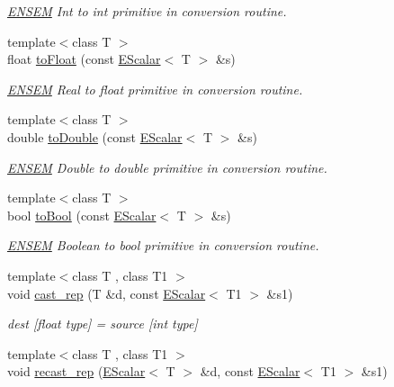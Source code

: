 \begin{DoxyCompactItemize}
\begin{DoxyCompactList}\small\item\em \mbox{\hyperlink{namespaceENSEM}{E\+N\+S\+EM}} Int to int primitive in conversion routine. \end{DoxyCompactList}\item 
{\footnotesize template$<$class T $>$ }\\float \mbox{\hyperlink{group__escalar_gaf21f130175f8bc3a98a90272dc196b2c}{to\+Float}} (const \mbox{\hyperlink{classENSEM_1_1EScalar}{E\+Scalar}}$<$ T $>$ \&s)
\begin{DoxyCompactList}\small\item\em \mbox{\hyperlink{namespaceENSEM}{E\+N\+S\+EM}} Real to float primitive in conversion routine. \end{DoxyCompactList}\item 
{\footnotesize template$<$class T $>$ }\\double \mbox{\hyperlink{group__escalar_ga981890bacedbaccd67983030f792d927}{to\+Double}} (const \mbox{\hyperlink{classENSEM_1_1EScalar}{E\+Scalar}}$<$ T $>$ \&s)
\begin{DoxyCompactList}\small\item\em \mbox{\hyperlink{namespaceENSEM}{E\+N\+S\+EM}} Double to double primitive in conversion routine. \end{DoxyCompactList}\item 
{\footnotesize template$<$class T $>$ }\\bool \mbox{\hyperlink{group__escalar_ga67754bbbfd7795820548f6c6bb9c6b19}{to\+Bool}} (const \mbox{\hyperlink{classENSEM_1_1EScalar}{E\+Scalar}}$<$ T $>$ \&s)
\begin{DoxyCompactList}\small\item\em \mbox{\hyperlink{namespaceENSEM}{E\+N\+S\+EM}} Boolean to bool primitive in conversion routine. \end{DoxyCompactList}\item 
{\footnotesize template$<$class T , class T1 $>$ }\\void \mbox{\hyperlink{group__escalar_ga1fe36c2ff072b322fac723a4e44f6584}{cast\+\_\+rep}} (T \&d, const \mbox{\hyperlink{classENSEM_1_1EScalar}{E\+Scalar}}$<$ T1 $>$ \&s1)
\begin{DoxyCompactList}\small\item\em dest \mbox{[}float type\mbox{]} = source \mbox{[}int type\mbox{]} \end{DoxyCompactList}\item 
{\footnotesize template$<$class T , class T1 $>$ }\\void \mbox{\hyperlink{group__escalar_ga49ac1b22b18f5dd54cdf91fbf9a4e3b2}{recast\+\_\+rep}} (\mbox{\hyperlink{classENSEM_1_1EScalar}{E\+Scalar}}$<$ T $>$ \&d, const \mbox{\hyperlink{classENSEM_1_1EScalar}{E\+Scalar}}$<$ T1 $>$ \&s1)

\end{DoxyCompactItemize}
